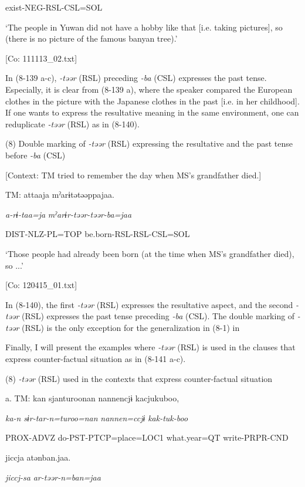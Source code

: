       exist-NEG-RSL-CSL=SOL

      ‘The people in Yuwan did not have a hobby like that [i.e. taking pictures], so (there is no picture of the famous banyan tree).’

      [Co: 111113\_02.txt]

In (8-139 a-c), \textit{-təər} (RSL) preceding \textit{{}-ba} (CSL) expresses the past tense. Especially, it is clear from (8-139 a), where the speaker compared the European clothes in the picture with the Japanese clothes in the past [i.e. in her childhood]. If one wants to express the resultative meaning in the same environment, one can reduplicate \textit{-təər} (RSL) as in (8-140).

(8)  Double marking of \textit{{}-təər} (RSL) expressing the resultative and the past tense before \textit{{}-ba} (CSL)

  [Context: TM tried to remember the day when MS’s grandfather died.]

  TM:  attaaja  mˀarɨtətəəppajaa.

    \textit{a-rɨ-taa=ja}  \textit{mˀarɨr-təər-təər-ba=jaa}

    DIST-NLZ-PL=TOP  be.born-RSL-RSL-CSL=SOL

    ‘Those people had already been born (at the time when MS’s grandfather died), so ...’

    [Co: 120415\_01.txt]

In (8-140), the first \textit{{}-təər} (RSL) expresses the resultative aspect, and the second \textit{{}-təər} (RSL) expresses the past tense preceding \textit{-ba} (CSL). The double marking of \textit{{}-təər} (RSL) is the only exception for the generalization in (8-1) in 

  Finally, I will present the examples where \textit{{}-təər} (RSL) is used in the clauses that express counter-factual situation as in (8-141 a-c). 

(8)  \textit{{}-təər} (RSL) used in the contexts that express counter-factual situation

  a.  TM:  kan  sjanturoonan  {\textbar}nannen{\textbar}cjɨ  kacjukuboo,

      \textit{ka-n}  \textit{sɨr-tar-n=turoo=nan}  \textit{nannen=ccjɨ}  \textit{kak-tuk-boo}

      PROX-ADVZ  do-PST-PTCP=place=LOC1  what.year=QT  write-PRPR-CND

      jiccja  atənban.jaa.  

      \textit{jiccj-sa}  \textit{ar-təər{}-n=ban=jaa} 


